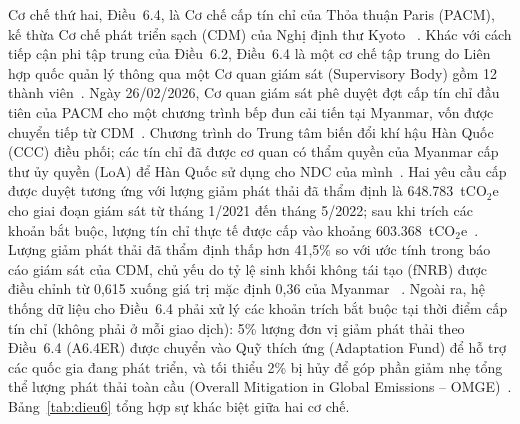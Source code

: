 Cơ chế thứ hai, Điều~6.4, là Cơ chế cấp tín chỉ của Thỏa thuận Paris (PACM), kế thừa Cơ chế phát triển sạch (CDM) của Nghị định thư Kyoto~\cite{columbia2025article6} \cite{unfccc2022cma3}. Khác với cách tiếp cận phi tập trung của Điều~6.2, Điều~6.4 là một cơ chế tập trung do Liên hợp quốc quản lý thông qua một Cơ quan giám sát (Supervisory Body) gồm 12 thành viên~\cite{columbia2025article6}. Ngày 26/02/2026, Cơ quan giám sát phê duyệt đợt cấp tín chỉ đầu tiên của PACM cho một chương trình bếp đun cải tiến tại Myanmar, vốn được chuyển tiếp từ CDM~\cite{unfccc2026pacm}. Chương trình do Trung tâm biến đổi khí hậu Hàn Quốc (CCC) điều phối; các tín chỉ đã được cơ quan có thẩm quyền của Myanmar cấp thư ủy quyền (LoA) để Hàn Quốc sử dụng cho NDC của mình~\cite{fastmarkets2026pacm}. Hai yêu cầu cấp được duyệt tương ứng với lượng giảm phát thải đã thẩm định là 648.783~tCO$_2$e cho giai đoạn giám sát từ tháng 1/2021 đến tháng 5/2022; sau khi trích các khoản bắt buộc, lượng tín chỉ thực tế được cấp vào khoảng 603.368~tCO$_2$e~\cite{fastmarkets2026pacm}. Lượng giảm phát thải đã thẩm định thấp hơn 41,5\% so với ước tính trong báo cáo giám sát của CDM, chủ yếu do tỷ lệ sinh khối không tái tạo (fNRB) được điều chỉnh từ 0,615 xuống giá trị mặc định 0,36 của Myanmar~\cite{unfccc2026pacm} \cite{fastmarkets2026pacm}. Ngoài ra, hệ thống dữ liệu cho Điều~6.4 phải xử lý các khoản trích bắt buộc tại thời điểm cấp tín chỉ (không phải ở mỗi giao dịch): 5\% lượng đơn vị giảm phát thải theo Điều~6.4 (A6.4ER) được chuyển vào Quỹ thích ứng (Adaptation Fund) để hỗ trợ các quốc gia đang phát triển, và tối thiểu 2\% bị hủy để góp phần giảm nhẹ tổng thể lượng phát thải toàn cầu (Overall Mitigation in Global Emissions -- OMGE)~\cite{unfccc2022cma3}. Bảng~\ref{tab:dieu6} tổng hợp sự khác biệt giữa hai cơ chế.

